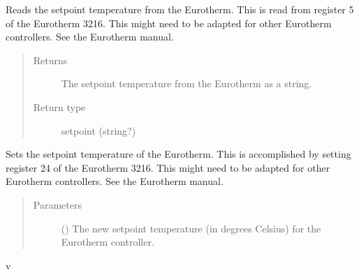 \documentclass[letterpaper,10pt,english]{sphinxmanual}
\begin{document}
\begin{fulllineitems}
\begin{fulllineitems}
\label{\detokenize{vtipy_docs/vtipy:vtipy.temperature.temperature_controllers.read_setpoint}}
Reads the setpoint temperature from the Eurotherm. This is read from
register 5 of the Eurotherm 3216. This might need to be adapted for
other Eurotherm controllers. See the Eurotherm manual.
\begin{quote}\begin{description}
\item[{Returns}] \leavevmode
The setpoint temperature from the Eurotherm as a string.

\item[{Return type}] \leavevmode
setpoint (string?)

\end{description}\end{quote}

\end{fulllineitems}


\begin{fulllineitems}
\label{\detokenize{vtipy_docs/vtipy:vtipy.temperature.temperature_controllers.set_setpoint}}
Sets the setpoint temperature of the Eurotherm. This is accomplished by
setting register 24 of the Eurotherm 3216. This might need to be
adapted for other Eurotherm controllers. See the Eurotherm manual.
\begin{quote}\begin{description}
\item[{Parameters}] \leavevmode
{} () \textendash{} The new setpoint temperature (in degrees Celsius)
for the Eurotherm controller.

\end{description}\end{quote}

\end{fulllineitems}


\end{fulllineitems}



\renewcommand{\indexname}{Python Module Index}
\begin{sphinxtheindex}
\def\bigletter#1{{\Large\sffamily#1}\nopagebreak\vspace{1mm}}
\bigletter{v}
\item {}
\item {}
\end{sphinxtheindex}

\renewcommand{\indexname}{Index}
\printindex
\end{document}
